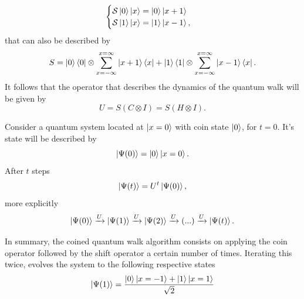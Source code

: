 \documentclass[../../dissertation.tex]{subfiles}
\begin{document}
\begin{equation}
	\begin{cases}
		\mathcal{S} \ket{0}\ket{x} = \ket{0}\ket{x+1}\\
		\mathcal{S} \ket{1}\ket{x} = \ket{1}\ket{x-1},
	\end{cases}
\end{equation}
that can also be described by
\begin{equation}
	S = \ket{0}\bra{0} \otimes \sum_{x=-\infty}^{x=\infty} \ket{x+1}\bra{x} + \ket{1}\bra{1}\otimes \sum_{x=-\infty}^{x=\infty} \ket{x-1}\bra{x}.
	\label{eq:coinedShiftOperator}
\end{equation}
It follows that the operator that describes the dynamics of the quantum walk
will be given by 
\begin{equation}
	U = S(C\otimes I) = S(H\otimes I). 
	\label{eq:coinedUnmarkedOperator}
\end{equation}\par
Consider a quantum system located at $\ket{x = 0}$ with coin state $\ket{0}$,
for $t=0$. It's state will be described by
\begin{equation}
	\ket{\Psi(0)} = \ket{0}\ket{x=0}.
	\label{eq:coinedQWInitCond0}
\end{equation}
After $t$ steps 
\begin{equation}
	\ket{\Psi(t)}=U^{t}\ket{\Psi(0)},
\end{equation}
more explicitly
\begin{equation}
	\ket{\Psi(0)}\xrightarrow[]{\text{$U$}}\ket{\Psi(1)}\xrightarrow[]{\text{$U$}}\ket{\Psi(2)}\xrightarrow[]{\text{$U$}} (...) \xrightarrow[]{\text{$U$}}\ket{\Psi(t)}.
\end{equation}\par
In summary, the coined quantum walk algorithm consists on applying the coin
operator followed by the shift operator a certain number of times. Iterating
this twice, evolves the system to the following respective states
\begin{equation}
	\ket{\Psi(1)} = \frac{\ket{0}\ket{x=-1}+\ket{1}\ket{x=1}}{\sqrt{2}}
\end{equation}
\end{document}
